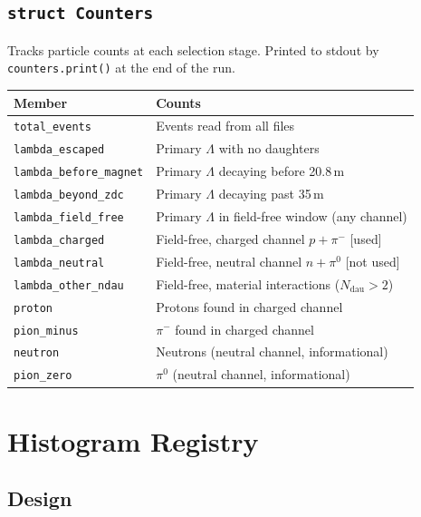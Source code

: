 \documentclass[11pt]{article}
\begin{document}
\subsection{\texttt{struct Counters}}
\label{sec:counters}

Tracks particle counts at each selection stage. Printed to stdout by
\texttt{counters.print()} at the end of the run.

\begin{center}
\renewcommand{\arraystretch}{1.3}
\begin{tabular}{ll}
\toprule
Member & Counts \\
\midrule
\texttt{total\_events} & Events read from all files \\
\texttt{lambda\_escaped} & Primary $\Lambda$ with no daughters \\
\texttt{lambda\_before\_magnet} & Primary $\Lambda$ decaying before 20.8\,m \\
\texttt{lambda\_beyond\_zdc} & Primary $\Lambda$ decaying past 35\,m \\
\texttt{lambda\_field\_free} & Primary $\Lambda$ in field-free window (any channel) \\
\texttt{lambda\_charged} & Field-free, charged channel $p+\pi^-$ [used] \\
\texttt{lambda\_neutral} & Field-free, neutral channel $n+\pi^0$ [not used] \\
\texttt{lambda\_other\_ndau} & Field-free, material interactions ($N_\text{dau}>2$) \\
\texttt{proton} & Protons found in charged channel \\
\texttt{pion\_minus} & $\pi^-$ found in charged channel \\
\texttt{neutron} & Neutrons (neutral channel, informational) \\
\texttt{pion\_zero} & $\pi^0$ (neutral channel, informational) \\
\bottomrule
\end{tabular}
\end{center}

\section{Histogram Registry}
\label{sec:histmap}

\subsection{Design}
\end{document}
